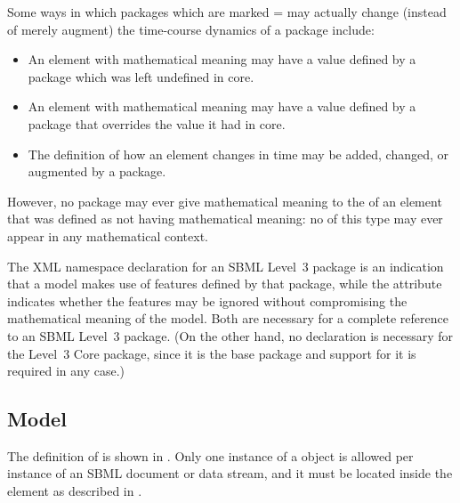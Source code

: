 \begin{enumerate}
\begin{blockRelChange}
Some ways in which packages which are marked  =  may actually change (instead of merely augment) the time-course dynamics of a package include:
\begin{itemize}
  \item An element with mathematical meaning may have a value defined by a package which was left undefined in core.
  \item An element with mathematical meaning may have a value defined by a package that overrides the value it had in core.
  \item The definition of how an element changes in time may be added, changed, or augmented by a package.
\end{itemize}
However, no package may ever give mathematical meaning to the  of an element that was defined as not having mathematical meaning: no  of this type may ever appear in any mathematical context.
\end{blockRelChange}

\end{enumerate}

The XML namespace declaration for an SBML Level~3 package is an
indication that a model makes use of features defined by that
package, while the  attribute indicates whether
the features may be ignored without compromising the mathematical
meaning of the model.  Both are necessary for a complete reference
to an SBML Level~3 package.  (On the other hand, no declaration is
necessary for the Level~3 Core package, since it is the base
package and support for it is required in any case.)


\subsection{Model}
\label{sec:model}

The definition of \Model is shown in .
Only one instance of a \Model object is allowed per instance of an
SBML \thisLV document or data stream, and it must be located
inside the  element as described in
.

